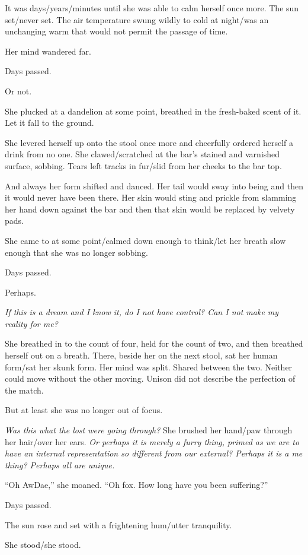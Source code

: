 It was days/years/minutes until she was able to calm herself once more. The sun set/never set. The air temperature swung wildly to cold at night/was an unchanging warm that would not permit the passage of time.

Her mind wandered far.

Days passed.

Or not.

She plucked at a dandelion at some point, breathed in the fresh-baked scent of it. Let it fall to the ground.

She levered herself up onto the stool once more and cheerfully ordered herself a drink from no one. She clawed/scratched at the bar's stained and varnished surface, sobbing. Tears left tracks in fur/slid from her cheeks to the bar top.

And always her form shifted and danced. Her tail would sway into being and then it would never have been there. Her skin would sting and prickle from slamming her hand down against the bar and then that skin would be replaced by velvety pads.

She came to at some point/calmed down enough to think/let her breath slow enough that she was no longer sobbing.

Days passed.

Perhaps.

\emph{If this is a dream and I know it, do I not have control? Can I not make my reality for me?}

She breathed in to the count of four, held for the count of two, and then breathed herself out on a breath. There, beside her on the next stool, sat her human form/sat her skunk form. Her mind was split. Shared between the two. Neither could move without the other moving. Unison did not describe the perfection of the match.

But at least she was no longer out of focus.

\emph{Was this what the lost were going through?} She brushed her hand/paw through her hair/over her ears. \emph{Or perhaps it is merely a furry thing, primed as we are to have an internal representation so different from our external? Perhaps it is a me thing? Perhaps all are unique.}

``Oh AwDae,'' she moaned. ``Oh fox. How long have you been suffering?''

Days passed.

The sun rose and set with a frightening hum/utter tranquility.

She stood/she stood.

